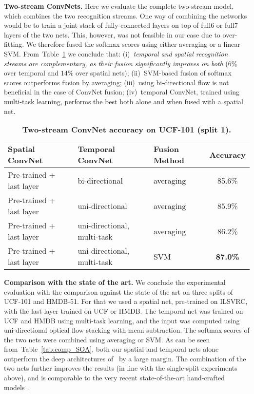 \documentclass{article} \usepackage{nips14submit_e,times}
\newcommand{\tblref}[1]{Table~\ref{#1}}
\begin{document}
\noindent\textbf{Two-stream ConvNets.}
Here we evaluate the complete two-stream model, which combines the two recognition streams. 
One way of combining the networks would be to train a joint stack of fully-connected layers on top of full6 or full7 layers of the two nets.
This, however, was not feasible in our case due to over-fitting. We therefore fused the softmax scores using either averaging or a linear SVM.
From~\tblref{tab:fusion} we conclude that: 
(i)~\emph{temporal and spatial recognition streams are complementary, as their fusion significantly improves on both} ($6\%$ over temporal and $14\%$ over spatial nets);
(ii)~SVM-based fusion of softmax scores outperforms fusion by averaging;
(iii)~using bi-directional flow is not beneficial in the case of ConvNet fusion; 
(iv)~temporal ConvNet, trained using multi-task learning, performs the best both alone and when fused with a spatial net.
\begin{table}[ht]
\small
\centering
\caption{\textbf{Two-stream ConvNet accuracy on UCF-101 (split 1).}
}
\begin{tabular}{|l|l|l|c|} \hline
Spatial ConvNet & Temporal ConvNet & Fusion Method & Accuracy \\ \hline
Pre-trained + last layer & bi-directional & averaging & 85.6\% \\ \hline
Pre-trained + last layer & uni-directional & averaging & 85.9\%  \\ \hline
Pre-trained + last layer & uni-directional, multi-task & averaging  & 86.2\% \\ \hline
Pre-trained + last layer & uni-directional, multi-task & SVM & \textbf{87.0\%} \\ \hline
\end{tabular}
\label{tab:fusion}
\end{table}


\noindent\textbf{Comparison with the state of the art.}
We conclude the experimental evaluation with the comparison against the state of the art on three splits of UCF-101 and HMDB-51.
For that we used a spatial net, pre-trained on ILSVRC, with the last layer trained on UCF or HMDB. 
The temporal net was trained on UCF and HMDB using multi-task learning, and the input was computed using uni-directional optical flow stacking with 
mean subtraction. The softmax scores of the two nets were combined using averaging or SVM.
As can be seen from~\tblref{tab:comp_SOA}, both our spatial and temporal nets alone outperform the deep architectures of~\cite{Karpathy14,Kuehne11} by a large margin.
The combination of the two nets further improves the results (in line with the single-split experiments above), and is comparable to the very recent 
state-of-the-art hand-crafted models~\cite{Wang13b,Peng14,Peng14a}.
\end{document}
